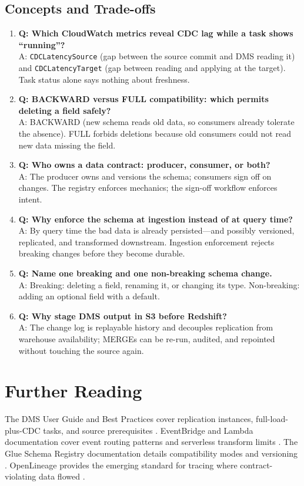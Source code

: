 \subsection{Concepts and Trade-offs}
\begin{enumerate}
    \item \textbf{Q: Which CloudWatch metrics reveal CDC lag while a task shows ``running''?}\\
    A: \texttt{CDCLatencySource} (gap between the source commit and DMS reading it) and \texttt{CDCLatencyTarget} (gap between reading and applying at the target). Task status alone says nothing about freshness.
    \item \textbf{Q: BACKWARD versus FULL compatibility: which permits deleting a field safely?}\\
    A: BACKWARD (new schema reads old data, so consumers already tolerate the absence). FULL forbids deletions because old consumers could not read new data missing the field.
    \item \textbf{Q: Who owns a data contract: producer, consumer, or both?}\\
    A: The producer owns and versions the schema; consumers sign off on changes. The registry enforces mechanics; the sign-off workflow enforces intent.
    \item \textbf{Q: Why enforce the schema at ingestion instead of at query time?}\\
    A: By query time the bad data is already persisted---and possibly versioned, replicated, and transformed downstream. Ingestion enforcement rejects breaking changes before they become durable.
    \item \textbf{Q: Name one breaking and one non-breaking schema change.}\\
    A: Breaking: deleting a field, renaming it, or changing its type. Non-breaking: adding an optional field with a default.
    \item \textbf{Q: Why stage DMS output in S3 before Redshift?}\\
    A: The change log is replayable history and decouples replication from warehouse availability; MERGEs can be re-run, audited, and repointed without touching the source again.
\end{enumerate}

\section{Further Reading}
The DMS User Guide and Best Practices cover replication instances, full-load-plus-CDC tasks, and source prerequisites \cite{awsDMSUserGuide,awsDMSBestPractices}. EventBridge and Lambda documentation cover event routing patterns and serverless transform limits \cite{awsEventBridgeDocs,awsLambdaDocs}. The Glue Schema Registry documentation details compatibility modes and versioning \cite{awsGlueSchemaRegistry}. OpenLineage provides the emerging standard for tracing where contract-violating data flowed \cite{openLineage}.

